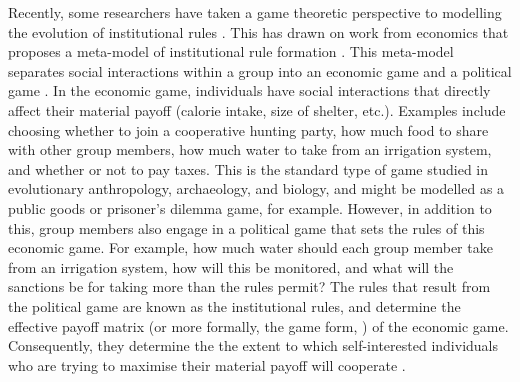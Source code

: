 \documentclass{rstb}
\begin{document}
\begin{linenumbers}
Recently, some researchers have taken a game theoretic perspective to modelling the evolution of institutional rules \cite{Powers:2013:a,Currie:2021:a,Gavrilets:2022:a}. This has drawn on work from economics that proposes a meta-model of institutional rule formation \cite{Hurwicz:1996:a,Reiter:1996:a}. This meta-model separates social interactions within a group into an economic game and a political game \cite{Powers:2016:a}. In the economic game, individuals have social interactions that directly affect their material payoff (calorie intake, size of shelter, etc.). Examples include choosing whether to join a cooperative hunting party, how much food to share with other group members, how much water to take from an irrigation system, and whether or not to pay taxes. This is the standard type of game studied in evolutionary anthropology, archaeology, and biology, and might be modelled as a public goods or prisoner's dilemma game, for example. However, in addition to this, group members also engage in a political game that sets the rules of this economic game. For example, how much water should each group member take from an irrigation system, how will this be monitored, and what will the sanctions be for taking more than the rules permit? The rules that result from the political game are known as the institutional rules, and determine the effective payoff matrix (or more formally, the game form, \cite{Hurwicz:1996:a}) of the economic game. Consequently, they determine the the extent to which self-interested individuals who are trying to maximise their material payoff will cooperate \cite{Greif:2006:a,Powers:2021:a}. 


\end{linenumbers}
\end{document}
